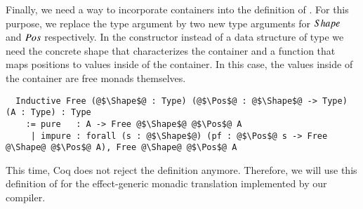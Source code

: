 Finally, we need a way to incorporate containers into the definition of .
For this purpose, we replace the type argument  by two new type arguments for $Shape$ and $Pos$ respectively.
In the  constructor instead of a data structure of type  we need the concrete shape  that characterizes the container and a function  that maps positions to values inside of the container.
In this case, the values inside of the container are free monads themselves.
\begin{verbatim}
  Inductive Free (@$\Shape$@ : Type) (@$\Pos$@ : @$\Shape$@ -> Type) (A : Type) : Type
    := pure   : A -> Free @$\Shape$@ @$\Pos$@ A
     | impure : forall (s : @$\Shape$@) (pf : @$\Pos$@ s -> Free @\Shape@ @$\Pos$@ A), Free @\Shape@ @$\Pos$@ A
\end{verbatim}
This time, Coq does not reject the definition anymore.
Therefore, we will use this definition of  for the effect-generic monadic translation implemented by our compiler.
